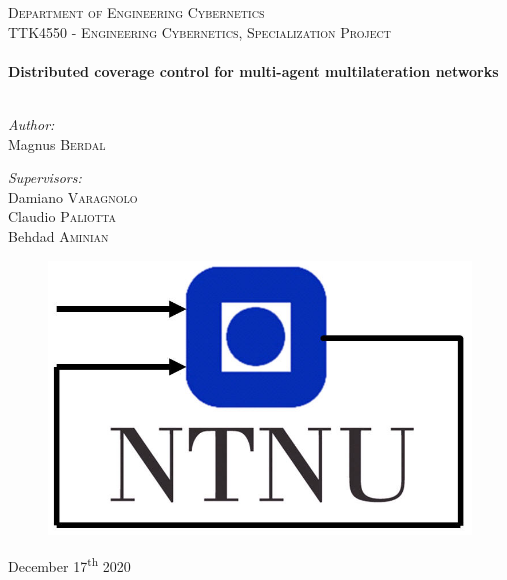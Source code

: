\begin{titlepage}
    \vbox{}
    \vbox{}
    \noindent\textsc{\LARGE Department of Engineering Cybernetics}\\[0.5cm]
    \textsc{\large TTK4550 - Engineering Cybernetics, Specialization Project}\\[0.5cm]
    \vbox{ }
    \HRule \\[0.4cm]
    { \huge \bfseries Distributed coverage control for multi-agent multilateration networks}\\[0.4cm]
    \HRule \\[1.5cm]
    \begin{minipage}{0.4\textwidth}
    \begin{flushleft} \large
    \emph{Author:}\\
    Magnus \textsc{Berdal}
    \end{flushleft}
    \end{minipage}
    \begin{minipage}{0.4\textwidth}
    \begin{flushright} \large
    \emph{Supervisors:} \\
    Damiano \textsc{Varagnolo}\\
    Claudio \textsc{Paliotta}\\
    Behdad \textsc{Aminian}
    \end{flushright}
    \end{minipage}
    \vfill
    \vfill
    \vfill
    \vfill
    \vfill
    \vfill
    \vfill
    \vfill
    \vfill
    \begin{figure}[h]
      \centering
      \includegraphics[width = .3\textwidth]{figs/itk_ntnu.jpg}
    \end{figure}
    \vfill
    December 17\textsuperscript{th} 2020
\end{titlepage}

\restoregeometry